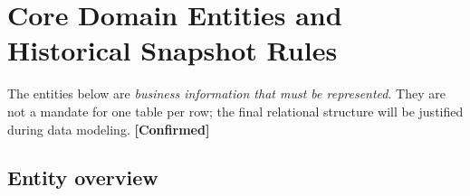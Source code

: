 \documentclass[11pt,a4paper]{article}
\newcommand{\tagconf}{\textcolor{green!45!black}{\textbf{[Confirmed]}}}
\begin{document}
\section{Core Domain Entities and Historical Snapshot Rules}

The entities below are \emph{business information that must be represented}.
They are not a mandate for one table per row; the final relational structure
will be justified during data modeling. \tagconf{}

\subsection{Entity overview}
\end{document}
